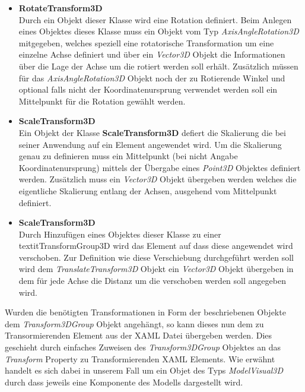 \begin{itemize}
\item \textbf{RotateTransform3D}\\
Durch ein Objekt dieser Klasse wird eine Rotation definiert. Beim Anlegen eines Objektes dieses Klasse muss ein Objekt vom Typ \textit{AxisAngleRotation3D} mitgegeben, welches speziell eine rotatorische Transformation um eine einzelne Achse definiert und über ein \textit{Vector3D} Objekt die Informationen über die Lage der Achse um die rotiert werden soll erhält. Zusätzlich müssen für das \textit{AxisAngleRotation3D} Objekt noch der zu Rotierende Winkel und optional falls nicht der Koordinatenursprung verwendet werden soll ein Mittelpunkt für die Rotation gewählt werden.

\item \textbf{ScaleTransform3D}\\
Ein Objekt der Klasse \textbf{ScaleTransform3D} defiert die Skalierung die bei seiner Anwendung auf ein Element angewendet wird. Um die Skalierung genau zu definieren muss ein Mittelpunkt (bei nicht Angabe Koordinatenursprung) mittels der Übergabe eines \textit{Point3D} Objektes definiert werden. Zusätzlich muss ein \textit{Vector3D} Objekt übergeben werden welches die eigentliche Skalierung entlang der Achsen, ausgehend vom Mittelpunkt definiert.

\item \textbf{ScaleTransform3D}\\
Durch Hinzufügen eines Objektes dieser Klasse zu einer \\textit{TransformGroup3D} wird das Element auf dass diese angewendet wird verschoben. Zur Definition wie diese Verschiebung durchgeführt werden soll wird dem \textit{TranslateTransform3D} Objekt ein \textit{Vector3D} Objekt übergeben in dem für jede Achse die Distanz um die verschoben werden soll angegeben wird.
\end{itemize}

Wurden die benötigten Transformationen in Form der beschriebenen Objekte dem \textit{ Transform3DGroup} Objekt angehängt, so kann dieses nun dem zu Transormierenden Element aus der XAML Datei übergeben werden. Dies geschieht durch einfaches Zuweisen des \textit{ Transform3DGroup} Objektes an das \textit{ Transform} Property zu Transformierenden XAML Elements. Wie erwähnt handelt es sich dabei in unserem Fall um ein Objet des Typs \textit{ModelVisual3D} durch dass jeweils eine Komponente des Modells dargestellt wird.



